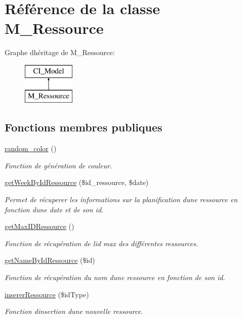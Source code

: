 \hypertarget{class_m___ressource}{}\section{Référence de la classe M\+\_\+\+Ressource}
\label{class_m___ressource}
Graphe d\textquotesingle{}héritage de M\+\_\+\+Ressource\+:\begin{figure}[H]
\begin{center}
\leavevmode
\includegraphics[height=2.000000cm]{class_m___ressource}
\end{center}
\end{figure}
\subsection*{Fonctions membres publiques}
\begin{DoxyCompactItemize}
\item 
\hyperlink{class_m___ressource_ac7c520b36f7bfa7d4093d2ee349ff167}{random\+\_\+color} ()
\begin{DoxyCompactList}\small\item\em Fonction de génération de couleur. \end{DoxyCompactList}\item 
\hyperlink{class_m___ressource_ad6d4fedbe62b5d1078c3deae236b06e6}{get\+Week\+By\+Id\+Ressource} (\$id\+\_\+ressource, \$date)
\begin{DoxyCompactList}\small\item\em Permet de récuperer les informations sur la planification d\textquotesingle{}une ressource en fonction d\textquotesingle{}une date et de son id. \end{DoxyCompactList}\item 
\hyperlink{class_m___ressource_a3edc6f0574b55776994086b8c7756f19}{get\+Max\+I\+D\+Ressource} ()
\begin{DoxyCompactList}\small\item\em Fonction de récupération de l\textquotesingle{}id max des différentes ressources. \end{DoxyCompactList}\item 
\hyperlink{class_m___ressource_a2b656abb4229679b9c3496f7f524b52b}{get\+Name\+By\+Id\+Ressource} (\$id)
\begin{DoxyCompactList}\small\item\em Fonction de récupération du nom d\textquotesingle{}une ressource en fonction de son id. \end{DoxyCompactList}\item 
\hyperlink{class_m___ressource_a5c0662c415fe3ca04cfa4f154a668064}{inserer\+Ressource} (\$id\+Type)
\begin{DoxyCompactList}\small\item\em Fonction d\textquotesingle{}insertion d\textquotesingle{}une nouvelle ressource. \end{DoxyCompactList}\end{DoxyCompactItemize}


